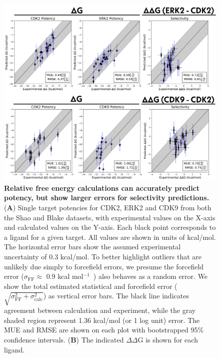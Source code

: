 \documentclass[9pt,lineno]{elife-modified} %
\begin{document}
\begin{figure}
\begin{fullwidth}
\begin{centering}
\includegraphics[width=1.0\linewidth]{figures/figure4.png}
\end{centering}
\caption{
\label{fig:figure-4}
{\bf Relative free energy calculations can accurately predict potency, but show larger errors for selectivity predictions.} \\
({\bf A}) Single target potencies for CDK2, ERK2 and CDK9 from both the Shao and Blake datasets, with experimental values on the X-axis and calculated values on the Y-axis. Each black point corresponds to a ligand for a given target. All values are shown in units of kcal/mol. The horizontal error bars show the assumed experimental uncertainty of 0.3 kcal/mol\citep{BROWN2009420}. To better highlight outliers that are unlikely due simply to forcefield errors, we presume the forcefield error ($\sigma_\mathrm{FF} \approx$ 0.9 kcal mol$^{-1}$~\cite{Harder:J.Chem.TheoryComput.:2016}) also behaves as a random error. We show the total estimated statistical and forcefield error ($\sqrt{\sigma_\mathrm{FF}^2 + \sigma_\mathrm{calc}^2}$) as vertical error bars. The black line indicates agreement between calculation and experiment, while the gray shaded region represent 1.36 kcal/mol (or 1 log unit) error. The MUE and RMSE are shown on each plot with bootstrapped 95$\%$ confidence intervals.
({\bf B}) The indicated $\Delta\Delta$G is shown for each ligand. 
}
\end{fullwidth}
\end{figure}
\end{document}
